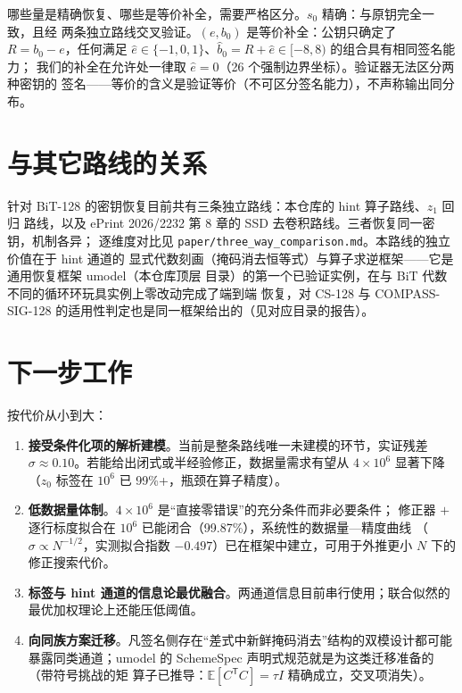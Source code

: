 \documentclass[UTF8,11pt,a4paper]{ctexart}
\newcommand{\code}[1]{\texttt{\small #1}}
\begin{document}
哪些量是精确恢复、哪些是等价补全，需要严格区分。$s_0$ 精确：与原钥完全一致，且经
两条独立路线交叉验证。$(e,b_0)$ 是等价补全：公钥只确定了 $R = b_0 - e$，任何满足
$\hat e \in \{-1,0,1\}$、$\hat b_0 = R + \hat e \in [-8,8)$ 的组合具有相同签名能力；
我们的补全在允许处一律取 $\hat e = 0$（26 个强制边界坐标）。验证器无法区分两种密钥的
签名——等价的含义是验证等价（不可区分签名能力），不声称输出同分布。

\section{与其它路线的关系}

针对 BiT-128 的密钥恢复目前共有三条独立路线：本仓库的 hint 算子路线、$z_1$ 回归
路线，以及 ePrint 2026/2232 第 8 章的 SSD 去卷积路线。三者恢复同一密钥，机制各异；
逐维度对比见 \code{paper/three\_way\_comparison.md}。本路线的独立价值在于 hint 通道的
显式代数刻画（掩码消去恒等式）与算子求逆框架——它是通用恢复框架 umodel（本仓库顶层
目录）的第一个已验证实例，在与 BiT 代数不同的循环环玩具实例上零改动完成了端到端
恢复，对 CS-128 与 COMPASS-SIG-128 的适用性判定也是同一框架给出的（见对应目录的报告）。

\section{下一步工作}

按代价从小到大：
\begin{enumerate}
\item \textbf{接受条件化项的解析建模}。当前是整条路线唯一未建模的环节，实证残差
  $\sigma \approx 0.10$。若能给出闭式或半经验修正，数据量需求有望从 $4\times10^6$
  显著下降（$z_0$ 标签在 $10^6$ 已 99\%+，瓶颈在算子精度）。
\item \textbf{低数据量体制}。$4\times10^6$ 是``直接零错误''的充分条件而非必要条件；
  修正器 $+$ 逐行标度拟合在 $10^6$ 已能闭合（99.87\%），系统性的数据量—精度曲线
  （$\sigma \propto N^{-1/2}$，实测拟合指数 $-0.497$）已在框架中建立，可用于外推更小
  $N$ 下的修正搜索代价。
\item \textbf{标签与 hint 通道的信息论最优融合}。两通道信息目前串行使用；联合似然的
  最优加权理论上还能压低阈值。
\item \textbf{向同族方案迁移}。凡签名侧存在``差式中新鲜掩码消去''结构的双模设计都可能
  暴露同类通道；umodel 的 SchemeSpec 声明式规范就是为这类迁移准备的（带符号挑战的矩
  算子已推导：$\mathbb{E}[C^{\mathsf T}C] = \tau I$ 精确成立，交叉项消失）。
\end{enumerate}
\end{document}
